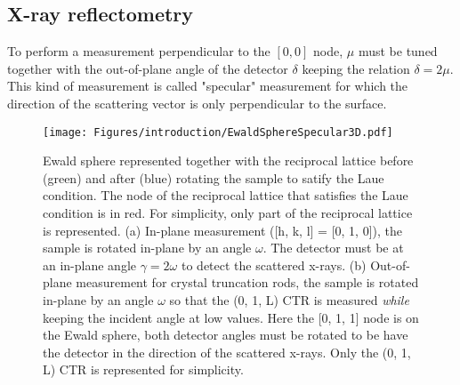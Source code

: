 \subsection{X-ray reflectometry}\label{sec:XRR}

To perform a measurement perpendicular to the $[0, 0]$ node, $\mu$ must be tuned together with the out-of-plane angle of the detector $\delta$ keeping the relation $\delta=2\mu$.
This kind of measurement is called "specular" measurement for which the direction of the scattering vector is only perpendicular to the surface.

\begin{figure}[!htb]
    \centering
    \texttt{[image: Figures/introduction/EwaldSphereSpecular3D.pdf]}
    \caption{
    Ewald sphere represented together with the reciprocal lattice before (green) and after (blue) rotating the sample to satify the Laue condition.
    The node of the reciprocal lattice that satisfies the Laue condition is in red.
    For simplicity, only part of the reciprocal lattice is represented.
    (a) In-plane measurement ([h, k, l] = [0, 1, 0]), the sample is rotated in-plane by an angle $\omega$.
    The detector must be at an in-plane angle $\gamma=2\omega$ to detect the scattered x-rays.
    (b) Out-of-plane measurement for crystal truncation rods, the sample is rotated in-plane by an angle $\omega$ so that the (0, 1, L) CTR is measured \textit{while} keeping the incident angle at low values.
    Here the [0, 1, 1] node is on the Ewald sphere, both detector angles must be rotated to be have the detector in the direction of the scattered x-rays.
    Only the (0, 1, L) CTR is represented for simplicity.
    }
    \label{fig:EwaldSphereSpecular}
\end{figure}